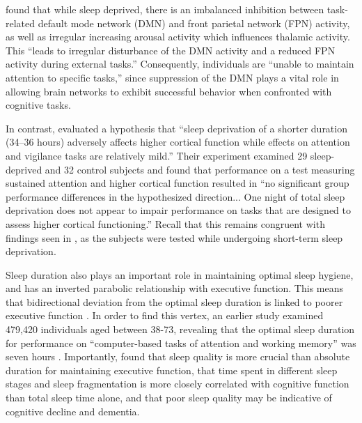 \documentclass[stu, 12pt]{apa7}
\begin{document}
\citeauthor{9} found that while sleep deprived, there is an imbalanced inhibition between task-related default mode network (DMN) and front parietal network (FPN) activity, as well as irregular increasing arousal activity which influences thalamic activity. This ``leads to irregular disturbance of the DMN activity and a reduced FPN activity during external tasks.'' Consequently, individuals are ``unable to maintain attention to specific tasks,'' since suppression of the DMN plays a vital role in allowing brain networks to exhibit successful behavior when confronted with cognitive tasks. \parencite{1}

In contrast, \cite{10} evaluated a hypothesis that ``sleep deprivation of a shorter duration (34–36 hours) adversely affects higher cortical function while effects on attention and vigilance tasks are relatively mild.'' Their experiment examined 29 sleep-deprived and 32 control subjects and found that performance on a test measuring sustained attention and higher cortical function resulted in ``no significant group performance differences in the hypothesized direction... One night of total sleep deprivation does not appear to impair performance on tasks that are designed to assess higher cortical functioning.'' Recall that this remains congruent with findings seen in \cite{8}, as the subjects were tested while undergoing short-term sleep deprivation.

Sleep duration also plays an important role in maintaining optimal sleep hygiene, and has an inverted parabolic relationship with executive function. This means that bidirectional deviation from the optimal sleep duration is linked to poorer executive function \parencite{2}. In order to find this vertex, an earlier study examined 479,420 individuals aged between 38-73, revealing that the optimal sleep duration for performance on ``computer-based tasks of attention and working memory'' was seven hours \parencite{11}. Importantly, \citeauthor{2} found that sleep quality is more crucial than absolute duration for maintaining executive function, that time spent in different sleep stages and sleep fragmentation is more closely correlated with cognitive function than total sleep time alone, and that poor sleep quality may be indicative of cognitive decline and dementia.
\end{document}
